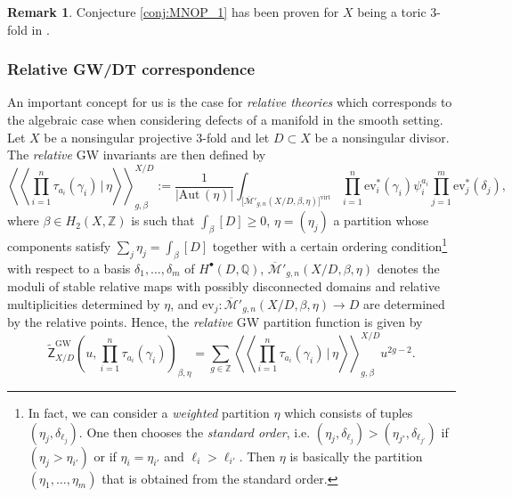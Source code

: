 \documentclass[11pt,colorinlistoftodos]{amsart}
\numberwithin{equation}{subsection}
\theoremstyle{plain}
\theoremstyle{definition}
\newtheorem{rem}[thm]{Remark}
\theoremstyle{remark}
\newcommand{\Z}{\mathbb{Z}}
\newcommand{\Q}{\mathbb{Q}}
\newcommand{\calM}{\mathcal{M}}
\begin{document}
\begin{rem}
Conjecture \ref{conj:MNOP_1} has been proven for $X$ being a toric 3-fold in \cite{MaulikOblomkovOkounkovPandharipande2011}.
\end{rem}
\subsubsection{Relative GW/DT correspondence}
An important concept for us is the case for \emph{relative theories} which corresponds to the algebraic case when considering defects of a manifold in the smooth setting. Let $X$ be a nonsingular projective 3-fold and let $D\subset X$ be a nonsingular divisor. The \emph{relative} GW invariants are then defined by 
\begin{equation}
    \label{eq:relative_GW_invariants}
    \left\langle\!\left\langle\prod_{i=1}^n\tau_{a_i}(\gamma_i)\,\Bigg|\,\eta\right\rangle\!\right\rangle^{X/D}_{g,\beta}:=\frac{1}{\vert\mathrm{Aut}\,(\eta)\vert}\int_{\big[\overline{\calM}'_{g,n}(X/D,\beta,\eta)\big]^\mathrm{virt}}\prod_{i=1}^n\mathrm{ev}^*_i(\gamma_i)\psi_i^{a_i}\prod_{j=1}^m\mathrm{ev}^*_j(\delta_j),
\end{equation}
where $\beta\in H_2(X,\Z)$ is such that $\int_\beta[D]\geq0$, $\eta=(\eta_j)$ a partition whose components satisfy $\sum_j\eta_j=\int_\beta[D]$ together with a certain ordering condition\footnote{In fact, we can consider a \emph{weighted} partition $\eta$ which consists of tuples $(\eta_j,\delta_{\ell_j})$. One then chooses the \emph{standard order}, i.e. $(\eta_j,\delta_{\ell_j})>(\eta_{j'},\delta_{\ell_{j'}})$ if $(\eta_j>\eta_{i'})$ or if $\eta_i=\eta_{i'}$ and $\ell_i>\ell_{i'}$. Then $\eta$ is basically the partition $(\eta_1,\ldots,\eta_m)$ that is obtained from the standard order.} with respect to a basis $\delta_1,\ldots, \delta_m$ of $H^\bullet(D,\Q)$, $\overline{\calM}'_{g,n}(X/D,\beta,\eta)$ denotes the moduli of stable relative maps with possibly disconnected domains and relative multiplicities determined by $\eta$, and $\mathrm{ev}_j\colon \overline{\calM}'_{g,n}(X/D,\beta,\eta)\to D$ are determined by the relative points. Hence, the \emph{relative} GW partition function is given by
\begin{equation}
    \label{eq:relative_GW_partition_function}
    \widetilde{\mathsf{Z}}^\mathrm{GW}_{X/D}\left(u, \prod_{i=1}^n\tau_{a_i}(\gamma_i)\right)_{\beta,\eta}=\sum_{g\in\Z}\left\langle\!\left\langle\prod_{i=1}^n\tau_{a_i}(\gamma_i)\,\Bigg|\, \eta\right\rangle\!\right\rangle^{X/D}_{g,\beta}u^{2g-2}.
\end{equation}
\end{document}
